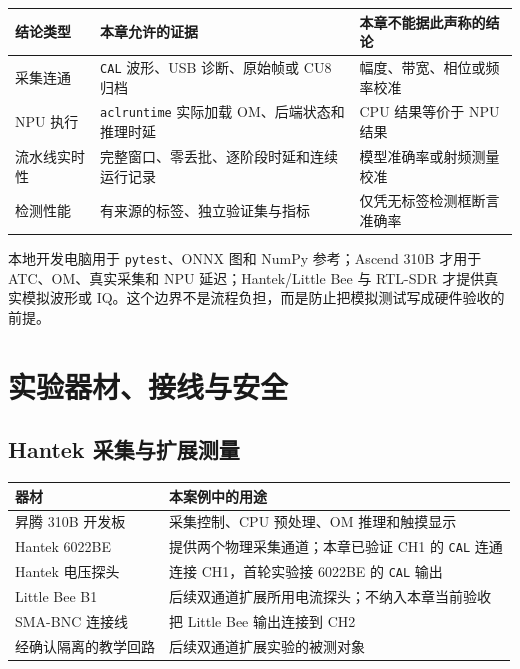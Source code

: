 \begin{longtable}[]{@{}
  >{\raggedright\arraybackslash}p{}
  >{\raggedright\arraybackslash}p{}
  >{\raggedright\arraybackslash}p{}@{}}
\toprule\noalign{}
\begin{minipage}[b]{\linewidth}\raggedright
结论类型
\end{minipage} & \begin{minipage}[b]{\linewidth}\raggedright
本章允许的证据
\end{minipage} & \begin{minipage}[b]{\linewidth}\raggedright
本章不能据此声称的结论
\end{minipage} \\
\midrule\noalign{}
\endhead
\bottomrule\noalign{}
\endlastfoot
采集连通 & \passthrough{\lstinline!CAL!} 波形、USB 诊断、原始帧或 CU8
归档 & 幅度、带宽、相位或频率校准 \\
NPU 执行 & \passthrough{\lstinline!aclruntime!} 实际加载
OM、后端状态和推理时延 & CPU 结果等价于 NPU 结果 \\
流水线实时性 & 完整窗口、零丢批、逐阶段时延和连续运行记录 &
模型准确率或射频测量校准 \\
检测性能 & 有来源的标签、独立验证集与指标 &
仅凭无标签检测框断言准确率 \\
\end{longtable}

本地开发电脑用于 \passthrough{\lstinline!pytest!}、ONNX 图和 NumPy
参考；Ascend 310B 才用于 ATC、OM、真实采集和 NPU 延迟；Hantek/Little Bee
与 RTL-SDR 才提供真实模拟波形或
IQ。这个边界不是流程负担，而是防止把模拟测试写成硬件验收的前提。

\section{实验器材、接线与安全}\label{src-experiment-case5-hardware}

\subsection{Hantek
采集与扩展测量}\label{src-experiment-case5-hantek-bom}

\begin{longtable}[]{@{}ll@{}}
\toprule\noalign{}
器材 & 本案例中的用途 \\
\midrule\noalign{}
\endhead
\bottomrule\noalign{}
\endlastfoot
昇腾 310B 开发板 & 采集控制、CPU 预处理、OM 推理和触摸显示 \\
Hantek 6022BE & 提供两个物理采集通道；本章已验证 CH1 的
\passthrough{\lstinline!CAL!} 连通 \\
Hantek 电压探头 & 连接 CH1，首轮实验接 6022BE 的
\passthrough{\lstinline!CAL!} 输出 \\
Little Bee B1 & 后续双通道扩展所用电流探头；不纳入本章当前验收 \\
SMA-BNC 连接线 & 把 Little Bee 输出连接到 CH2 \\
经确认隔离的教学回路 & 后续双通道扩展实验的被测对象 \\
\end{longtable}

